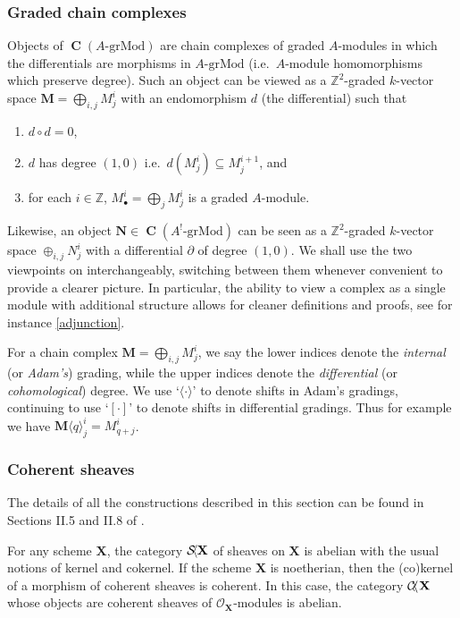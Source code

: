 \documentclass[a4paper]{article}
\theoremstyle{definition}
\theoremstyle{remark}
\newcommand{\grMod}{\ensuremath{\text{-grMod}}}
\DeclareMathOperator{\Ch}{\mathbf{C}}
\DeclareMathOperator{\coh}{\mathcal{C\kern -2pt o\kern -2pt h\kern -1pt}}
\DeclareMathOperator{\sh}{\mathcal{S\kern -2pt h\kern -2pt}}
\begin{document}
\subsubsection{Graded chain complexes}
\label{subsec-chaincomp}

Objects of \(\Ch(A\grMod)\) are chain complexes of graded \(A\)-modules in
which the differentials are morphisms in \(A\grMod\) (i.e.\ \(A\)-module
homomorphisms which preserve degree). Such an object can be viewed as a
\(\mathbb{Z}^2\)-graded \(k\)-vector space \(\mathbf{M}=\bigoplus_{i,j}M^i_j\)
with an endomorphism \(d\) (the differential) such that 
\begin{enumerate}
    \item \(d\circ d=0\), 
    \item \(d\) has degree \((1,0)\) i.e.\ \(d(M^i_j)\subseteq M^{i+1}_j\),
        and
    \item for each \(i\in \mathbb{Z}\), \(M^i_\bullet = \bigoplus_{j}
        M^i_j\) is a graded \(A\)-module.  
\end{enumerate} 
Likewise, an object \(\mathbf{N}\in \Ch(A^!\grMod)\) can be seen as a
\(\mathbb{Z}^2\)-graded \(k\)-vector space \(\oplus_{i,j}N^i_j\) with a
differential \(\partial\) of degree \((1,0)\). We shall use the two viewpoints
on interchangeably, switching between them whenever convenient to provide a
clearer picture. In particular, the ability to view a complex as a single module
with additional structure allows for cleaner definitions and proofs, see for
instance \cref{adjunction}.

For a chain complex \(\mathbf{M}=\bigoplus_{i,j}M^i_j\), we say the lower
indices denote the \textit{internal} (or \textit{Adam's}) grading, while the
upper indices denote the \textit{differential} (or \textit{cohomological})
degree.  We use `\(\langle\cdot\rangle\)' to denote shifts in Adam's gradings,
continuing to use `\([\cdot]\)' to denote shifts in differential gradings.  Thus
for example we have \(\mathbf{M}\langle q \rangle^i_j = M^i_{q+j}\).

\subsubsection{Coherent sheaves}

The details of all the constructions described in this section can be found in
Sections II.5 and II.8 of .

For any scheme \(\mathbf{X}\), the category \(\sh\mathbf{X}\) of sheaves on
\(\mathbf{X}\) is abelian with the usual notions of kernel and cokernel.
If the scheme \(\mathbf{X}\) is noetherian, then the
(co)kernel of a morphism of coherent sheaves is coherent. In this case, the category
\(\coh\mathbf{X}\) whose objects are coherent sheaves of
\(\mathscr{O}_\mathbf{X}\)-modules is abelian. 
\end{document}
